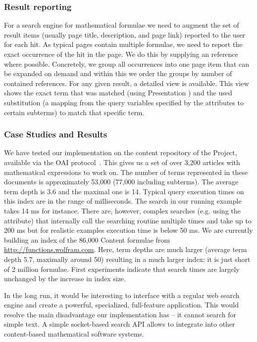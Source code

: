 \subsubsection{Result reporting}\label{subsec:result-reporting}

For a search engine for mathematical formulae we need to augment the set of result items
(usually page title, description, and page link) reported to the user for each hit. As
typical pages contain multiple formulae, we need to report the exact occurrence of the hit
in the page. We do this by supplying an {} reference where possible.
Concretely, we group all occurrences into one page item that can be expanded on demand and
within this we order the groups by number of contained references. For any given result, a
detailed view is available.  This view shows the exact term that was matched (using
Presentation {\mathml}) and the used substitution (a mapping from the query variables
specified by the {} attributes to certain subterms) to
match that specific term.

\subsubsection{Case Studies and Results}\label{sec:case-study}

We have tested our implementation on the content repository of the {\connexions} Project,
available via the OAI protocol~\cite{OAI:protocol}. This gives us a set of over 3,200
articles with mathematical expressions to work on. The number of terms represented in
these documents is approximately 53,000 (77,000 including subterms). The average term
depth is 3.6 and the maximal one is 14.  Typical query execution times on this index are
in the range of milliseconds. The search in our running example takes 14 ms for
instance. There are, however, complex searches (e.g. using the
{} attribute) that internally call the searching
routine multiple times and take up to 200 ms but for realistic examples execution time is
below 50 ms. We are currently building an index of the 86,000 Content {\mathml} formulae
from \url{http://functions.wolfram.com}. Here, term depths are much larger (average term
depth 5.7, maximally around 50) resulting in a much larger index: it is just short of 2
million formulae. First experiments indicate that search times are largely unchanged by
the increase in index size.

In the long run, it would be interesting to interface {\mmlsearch} with a regular web
search engine and create a powerful, specialized, full-feature application. This would
resolve the main disadvantage our implementation has -- it cannot search for simple
text. A simple socket-based search API allows to integrate {\mmlsearch} into other
content-based mathematical software systems.


